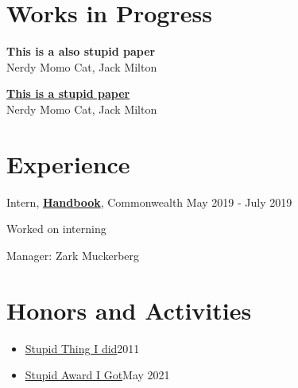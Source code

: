\section{Works in Progress}
\vspace{-.1275in}
\begin{flushleft}
\begin{bibsection}

\item[] {\textbf{This is a also stupid paper}} \\
Nerdy Momo Cat, Jack Milton\\
\item[] \href{www.arxiv.com/thisstupidpaperdoesnotexits}{\textbf{This is a stupid paper}} \\
Nerdy Momo Cat, Jack Milton\\

\end{bibsection}
\end{flushleft}

\section{Experience}

Intern, \href{www.handbook.com}{\textbf{Handbook}},
Commonwealth \hfill {May 2019 - July 2019} \\
\vspace{-.15in}
\begin{innerlist}
\item[]
\begin{innerlist}
\item[] Worked on interning
\item[] Manager: Zark Muckerberg
\end{innerlist}
\end{innerlist}
\vspace{.1in}


\section{Honors and Activities}
\begin{itemize}
[leftmargin=0pt,parsep=3pt,itemsep=0pt,topsep=0pt,partopsep=0pt]

\item[] \href{www.thingstodo.com/stupidthingidid}{Stupid Thing I did}\hfill {2011}
\item[] \href{www.stupidawardigot.com}{Stupid Award I Got}\hfill {May 2021}

\end{itemize}

